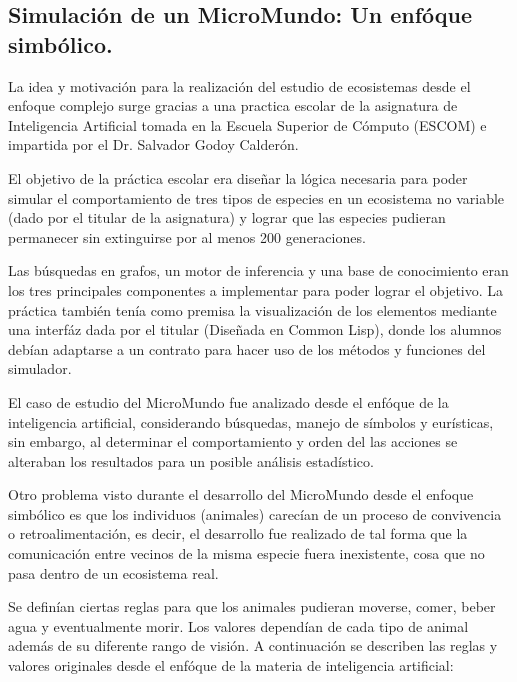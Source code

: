 \subsection{Simulación de un MicroMundo: Un enfóque simbólico.}
  La idea y motivación para la realización del estudio de ecosistemas desde el enfoque complejo surge gracias a una practica escolar de la asignatura de Inteligencia Artificial tomada en la Escuela Superior de Cómputo (ESCOM) e impartida por el Dr. Salvador Godoy Calderón.

  El objetivo de la práctica escolar era diseñar la lógica necesaria para poder simular el comportamiento de tres tipos de especies en un ecosistema no variable (dado por el titular de la asignatura) y lograr que las especies pudieran permanecer sin extinguirse por al menos 200 generaciones.

  Las búsquedas en grafos, un motor de inferencia y una base de conocimiento eran los tres principales componentes a implementar para poder lograr el objetivo. La práctica también tenía como premisa la visualización de los elementos mediante una interfáz dada por el titular (Diseñada en Common Lisp), donde los alumnos debían adaptarse a un contrato para hacer uso de los métodos y funciones del simulador.

  El caso de estudio del MicroMundo fue analizado desde el enfóque de la inteligencia artificial, considerando búsquedas, manejo de símbolos y eurísticas, sin embargo, al determinar el comportamiento y orden del las acciones se alteraban los resultados para un posible análisis estadístico. 

  Otro problema visto durante el desarrollo del MicroMundo desde el enfoque simbólico es que los individuos (animales) carecían de un proceso de convivencia o retroalimentación, es decir, el desarrollo fue realizado de tal forma que la comunicación entre vecinos de la misma especie fuera inexistente, cosa que no pasa dentro de un ecosistema real.

  Se definían ciertas reglas para que los animales pudieran moverse, comer, beber agua y eventualmente morir. Los valores dependían de cada tipo de animal además de su diferente rango de visión. A continuación se describen las reglas y valores originales desde el enfóque de la materia de inteligencia artificial:

